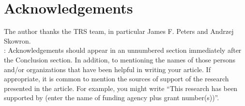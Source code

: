 \documentclass{llncs}
\begin{document}
\section*{Acknowledgements}
The author thanks the TRS team, in particular James F. Peters and Andrzej Skowron.
\vspace*{0.4cm}
\\
:  Acknowledgements should appear in an unnumbered section immediately after the Conclusion section.  In addition, to mentioning the names of those persons and/or organizations that have been helpful in writing your article.   If appropriate, it is common to mention the sources of support of the research presented in the article. For example, you might write ``This research has been supported by (enter the name of funding agency plus grant number(s))''.

% 

\end{document}
